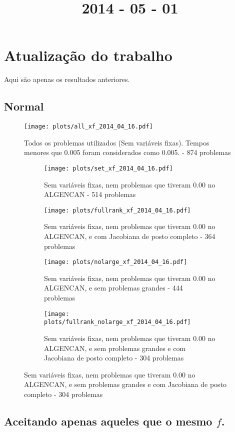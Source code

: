 \documentclass{article}
\title{2014 - 05 - 01}
\author{}
\date{}
\begin{document}
\maketitle
\section{Atualização do trabalho}

Aqui são apenas os resultados anteriores.

\subsection{Normal}

\begin{figure}[H]
  \centering
  \texttt{[image: plots/all\_xf\_2014\_04\_16.pdf]}
  \caption{Todos os problemas utilizados (Sem variáveis fixas). Tempos menores
    que 0.005 foram considerados como 0.005. - 874 problemas}
\end{figure}
\begin{figure}[H]
  \centering
  \begin{subfigure}{0.48\textwidth}
    \texttt{[image: plots/set\_xf\_2014\_04\_16.pdf]}
    \caption{Sem variáveis fixas, nem problemas
      que tiveram 0.00 no ALGENCAN - 514 problemas}
  \end{subfigure}
  \begin{subfigure}{0.48\textwidth}
    \texttt{[image: plots/fullrank\_xf\_2014\_04\_16.pdf]}
    \caption{Sem variáveis fixas, nem problemas
      que tiveram 0.00 no ALGENCAN, e com Jacobiana de posto completo - 364
      problemas}
  \end{subfigure}
  \begin{subfigure}{0.48\textwidth}
    \texttt{[image: plots/nolarge\_xf\_2014\_04\_16.pdf]}
    \caption{Sem variáveis fixas, nem problemas
      que tiveram 0.00 no ALGENCAN, e sem problemas grandes - 444 problemas}
  \end{subfigure}
  \begin{subfigure}{0.48\textwidth}
    \texttt{[image: plots/fullrank\_nolarge\_xf\_2014\_04\_16.pdf]}
    \caption{Sem variáveis fixas, nem problemas
      que tiveram 0.00 no ALGENCAN, e sem problemas grandes e com Jacobiana de
      posto completo - 304 problemas}
  \end{subfigure}
\end{figure}

\subsection{Aceitando apenas aqueles que o mesmo $f$. }
\end{document}
